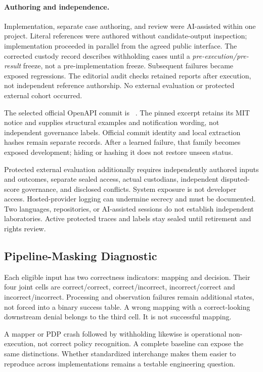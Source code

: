 \documentclass[11pt,letterpaper]{article}
\newcommand{\code}[1]{\texttt{\detokenize{#1}}}
\begin{document}
\paragraph{Authoring and independence.}
Implementation, separate case authoring, and review were AI-assisted within one
project. Literal references were authored without candidate-output inspection;
implementation proceeded in parallel from the agreed public interface. The
corrected custody record describes withholding cases until a
\emph{pre-execution/pre-result} freeze, not a pre-implementation freeze.
Subsequent failures became exposed regressions. The editorial audit checks
retained reports after execution, not independent reference authorship. No
external evaluation or protected external cohort occurred.

The selected official OpenAPI commit is
\code{755ee33b4a81d51f6f07a902cce26cbec3b822f2}~\cite{github-openapi}.
The pinned excerpt retains its MIT notice and supplies structural examples and
notification wording, not independent governance labels. Official commit
identity and local extraction hashes remain separate records. After a learned
failure, that family becomes exposed development;
hiding or hashing it does not restore unseen status.

Protected external evaluation additionally requires independently authored
inputs and outcomes, separate sealed access, actual custodians, independent
disputed-score governance, and disclosed conflicts. System exposure is not
developer access. Hosted-provider logging can undermine secrecy and must be
documented. Two languages, repositories, or AI-assisted sessions do not establish
independent laboratories. Active protected traces and labels stay sealed until
retirement and rights review.

\subsection{Pipeline-Masking Diagnostic}

Each eligible input has two correctness indicators: mapping and decision.
Their four joint cells are correct/correct, correct/incorrect,
incorrect/correct and incorrect/incorrect. Processing and observation failures
remain additional states, not forced into a binary success table. A wrong
mapping with a correct-looking downstream denial belongs to the third cell.
It is not successful mapping.

A mapper or PDP crash followed by withholding likewise is operational
non-execution, not correct policy recognition. A complete baseline can expose
the same distinctions. Whether standardized interchange makes them easier to
reproduce across implementations remains a testable engineering question.
\end{document}
